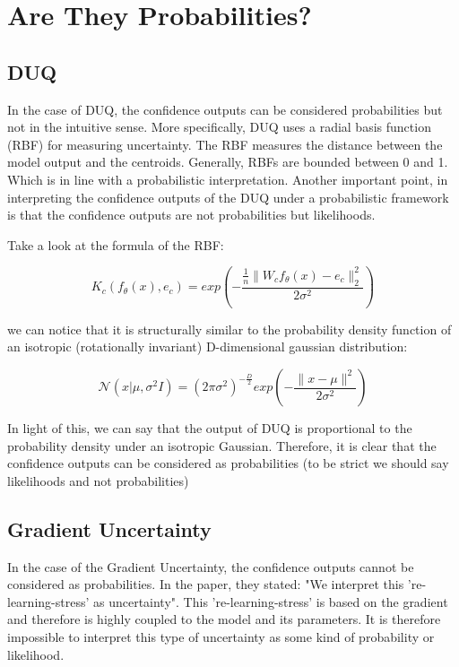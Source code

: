 \documentclass[11pt]{article}
\begin{document}
\section{Are They Probabilities?}
\label{sec:org64fa31c}
\subsection{DUQ}
\label{sec:orgccf721a}
In the case of DUQ, the confidence outputs can be  considered
probabilities but not in the intuitive sense.
More specifically, DUQ uses a radial basis function (RBF) for measuring
uncertainty. The RBF measures the distance between the model output
and the centroids. Generally, RBFs are bounded between 0 and 1.
Which is in line with a probabilistic interpretation.
Another important point, in interpreting the confidence outputs of the
DUQ under a probabilistic framework is that the confidence outputs
are not probabilities but likelihoods.

Take a look at the formula of the RBF:

\begin{equation}
\label{eq:org91d67d6}
K_c(f_{\theta}(x),e_c) = exp\left(- \frac{\frac{1}{n} \| W_cf_{\theta}(x)
-e_c \|_2^2}{2\sigma^2}\right)
\end{equation}

we can notice that it is structurally similar to the probability
density function of an isotropic (rotationally invariant)
D-dimensional gaussian distribution:

\begin{equation}
\label{eq:orgee68179}
\mathcal{N}(x | \mu,\sigma^2I) = (2\pi\sigma^2)^{-\frac{D}{2}} exp
\left(- \frac {\| x - \mu \|^2} {2\sigma^2} \right)
\end{equation}

In light of this, we can say that the output of DUQ is proportional to the
probability density under an isotropic Gaussian.
Therefore, it is clear that the confidence outputs can be considered
as probabilities (to be strict we should say likelihoods and not probabilities)
\subsection{Gradient Uncertainty}
\label{sec:org92c31b1}
In the case of the Gradient Uncertainty, the confidence outputs cannot
be considered as probabilities.
In the paper, they stated: "We interpret this
're-learning-stress' as uncertainty". This 're-learning-stress' is
based on the gradient and therefore is highly coupled to the model and
its parameters. It is therefore impossible to interpret this type of
uncertainty as some kind of probability or likelihood.
\end{document}
